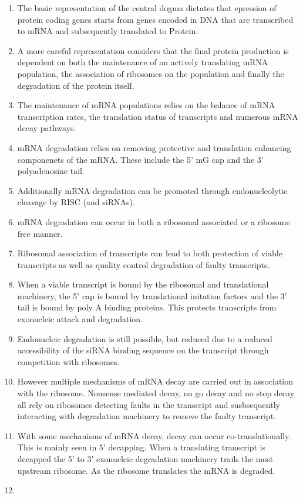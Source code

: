 \documentclass[review]{elsarticle}
\begin{document}
\begin{enumerate}
	\item  The basic representation of the central dogma dictates that epression of protein coding genes starts from genes encoded in DNA that are transcribed to mRNA and subsequently translated to Protein.
 	\item A more careful representation considers that the final protein production is dependent on both the maintenance of an actively translating mRNA population, the association of ribosomes on the population and finally the degradation of the protein itself.
	\item The maintenance of mRNA populations relies on the balance of mRNA transcription rates, the translation status of transcripts and numerous mRNA decay pathways.
	\item mRNA degradation relies on removing protective and translation enhancing componenets of the mRNA. These include the 5' mG cap and the 3' polyadenosine tail.   
	\item Additionally mRNA degradation can be promoted through endonucleolytic cleavage by RISC (and siRNAs).
	\item mRNA degradation can occur in both a ribosomal associated or a ribosome free manner.
	\item Ribosomal association of transcripts can lead to both protection of viable transcripts as well as quality control degradation of faulty transcripts. 
	\item When a viable transcript is bound by the ribosomal and translational machinery, the 5' cap is bound by translational initation factors and the 3' tail is bound by poly A binding proteins. This protects transcripts from exonucleic attack and degradation.
	\item Endonucleic degradation is still possible, but reduced due to a reduced accessibility of the siRNA binding sequence on the transcript through competition with ribosomes.
	\item However multiple mechanisms of mRNA decay are carried out in association with the ribosome. Nonsense mediated decay, no go decay and no stop decay all rely on ribosomes detecting faults in the transcript and susbsequently interacting with degradation machinery to remove the faulty transcript.
	\item With some mechanisms of mRNA decay, decay can occur co-translationally. This is mainly seen in 5' decapping. When a translating transcript is decapped the 5' to 3' exonucleic degradation machinery trails the most upstream ribosome. As the ribosome translates the mRNA is degraded.
	\item 

\end{enumerate}
\end{document}
